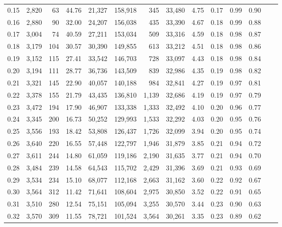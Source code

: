 \begin{tabular}{rrrrrrrrrrrrrr}
0.15 &  2,820 &   63 &   44.76 &   21,327 &  158,918 &     345 &  33,480 &  4.75 &  0.17 &  0.99 &      0.90 \\
0.16 &  2,880 &   90 &   32.00 &   24,207 &  156,038 &     435 &  33,390 &  4.67 &  0.18 &  0.99 &      0.88 \\
0.17 &  3,004 &   74 &   40.59 &   27,211 &  153,034 &     509 &  33,316 &  4.59 &  0.18 &  0.98 &      0.87 \\
0.18 &  3,179 &  104 &   30.57 &   30,390 &  149,855 &     613 &  33,212 &  4.51 &  0.18 &  0.98 &      0.86 \\
0.19 &  3,152 &  115 &   27.41 &   33,542 &  146,703 &     728 &  33,097 &  4.43 &  0.18 &  0.98 &      0.84 \\
0.20 &  3,194 &  111 &   28.77 &   36,736 &  143,509 &     839 &  32,986 &  4.35 &  0.19 &  0.98 &      0.82 \\
0.21 &  3,321 &  145 &   22.90 &   40,057 &  140,188 &     984 &  32,841 &  4.27 &  0.19 &  0.97 &      0.81 \\
0.22 &  3,378 &  155 &   21.79 &   43,435 &  136,810 &   1,139 &  32,686 &  4.19 &  0.19 &  0.97 &      0.79 \\
0.23 &  3,472 &  194 &   17.90 &   46,907 &  133,338 &   1,333 &  32,492 &  4.10 &  0.20 &  0.96 &      0.77 \\
0.24 &  3,345 &  200 &   16.73 &   50,252 &  129,993 &   1,533 &  32,292 &  4.03 &  0.20 &  0.95 &      0.76 \\
0.25 &  3,556 &  193 &   18.42 &   53,808 &  126,437 &   1,726 &  32,099 &  3.94 &  0.20 &  0.95 &      0.74 \\
0.26 &  3,640 &  220 &   16.55 &   57,448 &  122,797 &   1,946 &  31,879 &  3.85 &  0.21 &  0.94 &      0.72 \\
0.27 &  3,611 &  244 &   14.80 &   61,059 &  119,186 &   2,190 &  31,635 &  3.77 &  0.21 &  0.94 &      0.70 \\
0.28 &  3,484 &  239 &   14.58 &   64,543 &  115,702 &   2,429 &  31,396 &  3.69 &  0.21 &  0.93 &      0.69 \\
0.29 &  3,534 &  234 &   15.10 &   68,077 &  112,168 &   2,663 &  31,162 &  3.60 &  0.22 &  0.92 &      0.67 \\
0.30 &  3,564 &  312 &   11.42 &   71,641 &  108,604 &   2,975 &  30,850 &  3.52 &  0.22 &  0.91 &      0.65 \\
0.31 &  3,510 &  280 &   12.54 &   75,151 &  105,094 &   3,255 &  30,570 &  3.44 &  0.23 &  0.90 &      0.63 \\
0.32 &  3,570 &  309 &   11.55 &   78,721 &  101,524 &   3,564 &  30,261 &  3.35 &  0.23 &  0.89 &      0.62 \\

\end{tabular}
